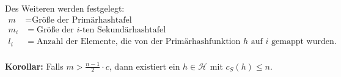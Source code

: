 \documentclass{scrartcl}%
\begin{document}
    \vspace*{0.3cm}
    Des Weiteren werden festgelegt:
    \begin{equation*}
        \begin{align*}
            m &= \text{Größe der Primärhashtafel} \\\nonumber
            m_i &= \text{Größe der $i$-ten Sekundärhashtafel} \\\nonumber
            l_i &= \text{Anzahl der Elemente, die von der Primärhashfunktion $h$ auf $i$ gemappt wurden.} \\\nonumber
        \end{align*}
    \end{equation*}


    \textbf{\textsf{Korollar:}} Falls $m > \frac{n-1}{2} \cdot c$, dann existiert ein $h \in \mathcal{H}$ mit $c_S(h) \leq n$.
\end{document}

